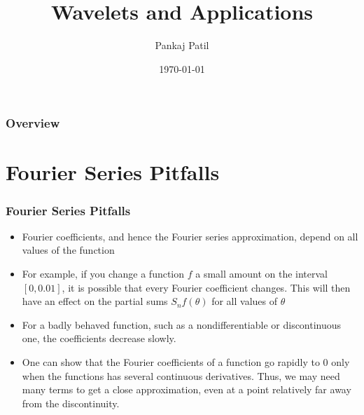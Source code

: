 \documentclass{beamer}
\title[Wavelets Applications]{Wavelets and Applications} %
\author{Pankaj Patil} %
\institute[UOFT] %
{
University of Toronto \\ %
\medskip
\textit{pankaj.patil@mail.utoronto.ca} %
}
\date{\today} %
\begin{document}
\begin{frame}
\titlepage %
\end{frame}

\begin{frame}
\frametitle{Overview} %
\tableofcontents %
\end{frame}


\section{Fourier Series Pitfalls} %

\begin{frame}
\frametitle{Fourier Series Pitfalls}

\begin{itemize}
    \item Fourier coefficients, and hence the Fourier series approximation, depend on all values of the function
    \item For example, if you change a function $f$ a small amount on the interval $[0, 0.01]$, it is possible that every Fourier coefficient changes. This will then have an effect on the partial sums $S_n f (\theta )$ for all values of $\theta$
    \item For a badly behaved function, such as a nondifferentiable or discontinuous one, the coefficients decrease slowly.
    \item One can show that the Fourier coefficients of a function go rapidly to 0 only when the functions has several continuous derivatives. Thus, we may need many terms to get a close approximation, even at a point relatively far away from the discontinuity.
\end{itemize}

\end{frame}
\end{document}
